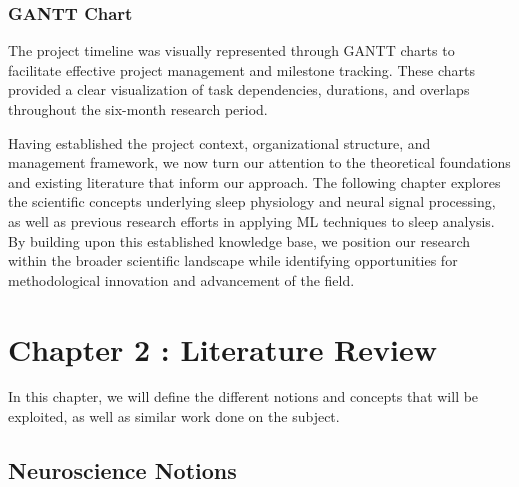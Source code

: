 \documentclass[a4paper,12pt,twoside]{article}
\begin{document}
\subsubsection{GANTT Chart}

The project timeline was visually represented through GANTT charts to facilitate effective project management and milestone tracking. These charts provided a clear visualization of task dependencies, durations, and overlaps throughout the six-month research period.




Having established the project context, organizational structure, and management framework, we now turn our attention to the theoretical foundations and existing literature that inform our approach. The following chapter explores the scientific concepts underlying sleep physiology and neural signal processing, as well as previous research efforts in applying ML techniques to sleep analysis. By building upon this established knowledge base, we position our research within the broader scientific landscape while identifying opportunities for methodological innovation and advancement of the field.

\section{Chapter 2 : Literature Review}
In this chapter, we will define the different notions and concepts that will be exploited, as well
as similar work done on the subject.
\subsection{Neuroscience Notions}
\end{document}
